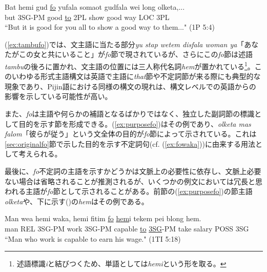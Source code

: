 \begin{exe}
  \ex
  \gll Bat hemi gud \underline{fo} yufala somaot gudfala wei long olketa,...\\
  but 3SG-PM good \underline{to} 2PL show good way LOC 3PL\\
  \glt ``But it is good for you all to show a good way to them..." (1P 5:4)
\end{exe}

(\ref{ex:tambufo})では、文主語に当たる部分\textit{yu stap wetem disfala woman ya}「あなたがこの女と共にいること」が\textit{fo}節で現されているが、さらにこの\textit{fo}節は述語\textit{tambu}の後ろに置かれ、文主語の位置には三人称代名詞\textit{hem}が置かれている\footnote{
述語標識\textit{i}と結びつくため、単語としては\textit{hemi}という形を取る。}。このいわゆる形式主語構文は英語で主語に\textit{that}節や不定詞節が来る際にも典型的な現象であり\citep[1049, 1391--1392]{english}、Pijin語における同様の構文の現れは、構文レベルでの英語からの影響を示している可能性が高い。

また、\textit{fo}は主語や何らかの補語となるばかりではなく、独立した副詞節の標識として目的を示す節を形成できる。(\ref{ex:purposefo})はその例であり、\textit{olketa mas falom}「彼らが従う」という文全体の目的が\textit{fo}節によって示されている。これは\ref{sec:originalfo}節で示した目的を示す不定詞句(cf. (\ref{ex:fowaka}))に由来する用法として考えられる。

最後に、\textit{fo}不定詞の主語を示すかどうかは文脈上の必要性に依存し、文脈上必要ない場合は省略されることが推測されるが、いくつかの例文においては冗長と思われる主語が\textit{fo}節として示されることがある。前節の(\ref{ex:purposefo})の節主語\textit{olketa}や、下に示す()の\textit{hem}はその例である。

\begin{exe}
  \ex
  \gll Man wea hemi waka, hemi fitim \underline{fo} \underline{hem}i tekem pei blong hem.\\
  man REL 3SG-PM work 3SG-PM capable \underline{to} \underline{3SG}-PM take salary POSS 3SG\\
  \glt ``Man who work is capable to earn his wage." (1TI 5:18)
\end{exe}
